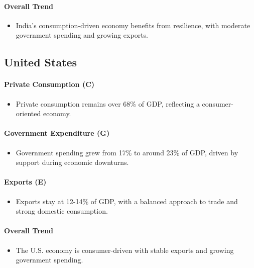 \documentclass[a4paper,12pt]{extarticle} %
\begin{document}
\paragraph{Overall Trend}
\begin{itemize}
    \item India’s consumption-driven economy benefits from resilience, with moderate government spending and growing exports.
\end{itemize}

\subsection{United States}

\paragraph{Private Consumption (C)}
\begin{itemize}
    \item Private consumption remains over 68\% of GDP, reflecting a consumer-oriented economy.
\end{itemize}

\paragraph{Government Expenditure (G)}
\begin{itemize}
    \item Government spending grew from 17\% to around 23\% of GDP, driven by support during economic downturns.
\end{itemize}

\paragraph{Exports (E)}
\begin{itemize}
    \item Exports stay at 12-14\% of GDP, with a balanced approach to trade and strong domestic consumption.
\end{itemize}

\paragraph{Overall Trend}
\begin{itemize}
    \item The U.S. economy is consumer-driven with stable exports and growing government spending.
\end{itemize}
\end{document}

